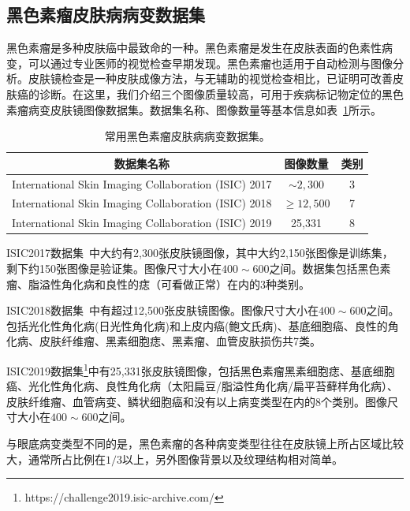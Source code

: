 \subsection{黑色素瘤皮肤病病变数据集}\label{subsec:original_dermatoscope_ds_intro}
黑色素瘤是多种皮肤癌中最致命的一种。黑色素瘤是发生在皮肤表面的色素性病变，可以通过专业医师的视觉检查早期发现。黑色素瘤也适用于自动检测与图像分析。皮肤镜检查是一种皮肤成像方法，与无辅助的视觉检查相比，已证明可改善皮肤癌的诊断。在这里，我们介绍三个图像质量较高，可用于疾病标记物定位的黑色素瘤病变皮肤镜图像数据集。数据集名称、图像数量等基本信息如表~\ref{tab:skin_datasets_info}所示。

\begin{table}[h]
	\centering
	\caption[常用黑色素瘤皮肤病病变数据集]{常用黑色素瘤皮肤病病变数据集。}
	\label{tab:skin_datasets_info}
	\begin{tabular}{c|c|c}
		\toprule[2pt]
		数据集名称 & 图像数量 & 类别 \\
		\midrule[2pt]
		International Skin Imaging Collaboration (ISIC) 2017 &  $\sim 2,300$ & 3  \\ \hline
		International Skin Imaging Collaboration (ISIC) 2018 & $\geq 12,500$ & 7  \\ \hline
		International Skin Imaging Collaboration (ISIC) 2019 & 25,331 & 8    \\ 
		\bottomrule[2pt]
	\end{tabular}
\end{table}

ISIC2017数据集~\cite{codella2018skin}中大约有2,300张皮肤镜图像，其中大约2,150张图像是训练集，剩下约150张图像是验证集。图像尺寸大小在$400\sim 600$之间。数据集包括黑色素瘤、脂溢性角化病和良性的痣（可看做正常）在内的3种类别。

ISIC2018数据集~\cite{codella2019skin, tschandl2018ham10000}中有超过12,500张皮肤镜图像。图像尺寸大小在$400\sim 600$之间。包括光化性角化病(日光性角化病)和上皮内癌(鲍文氏病)、基底细胞癌、良性的角化病、皮肤纤维瘤、黑素细胞痣、黑素瘤、血管皮肤损伤共7类。

ISIC2019数据集\footnote{https://challenge2019.isic-archive.com/}中有25,331张皮肤镜图像，包括黑色素瘤黑素细胞痣、基底细胞癌、光化性角化病、良性角化病（太阳扁豆/脂溢性角化病/扁平苔藓样角化病）、皮肤纤维瘤、血管病变、鳞状细胞癌和没有以上病变类型在内的8个类别。图像尺寸大小在$400\sim 600$之间。

与眼底病变类型不同的是，黑色素瘤的各种病变类型往往在皮肤镜上所占区域比较大，通常所占比例在$1/3$以上，另外图像背景以及纹理结构相对简单。

